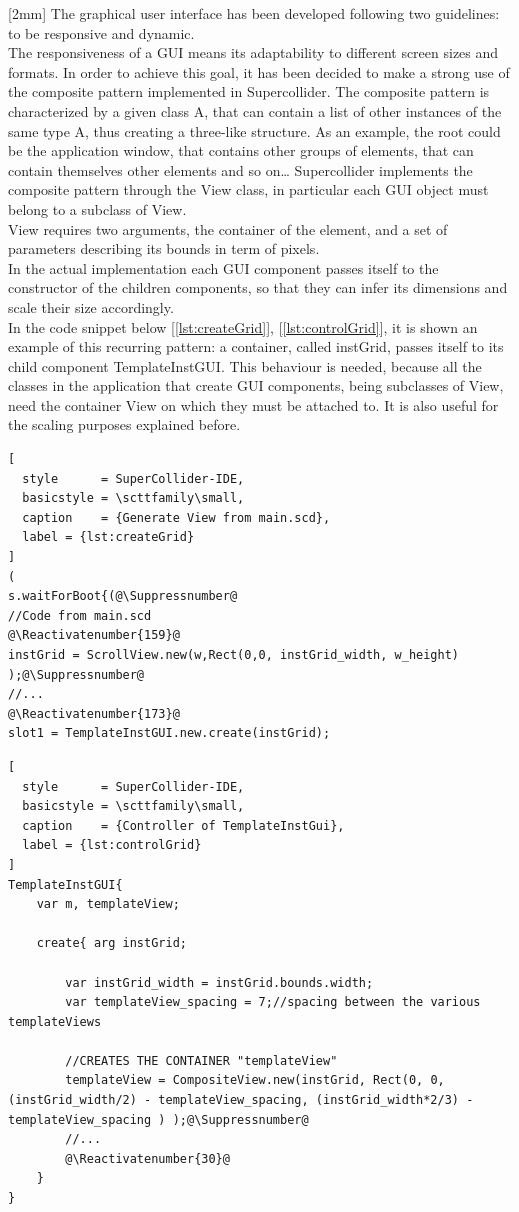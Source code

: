 \documentclass[main.tex]{subfiles}
\begin{document}
[2mm]
The graphical user interface has been developed following two guidelines: to be responsive and dynamic.\\
[2mm]
The responsiveness of a GUI means its adaptability to different screen sizes and formats. In order to achieve this goal, it has been decided to make a strong use of the composite pattern implemented in Supercollider.
The composite pattern is characterized by a given class A, that can contain a list of other instances of the same type A, thus creating a three-like structure. As an example, the root could be the application window, that contains other groups of elements, that can contain themselves other elements and so on…
Supercollider implements the composite pattern through the View class, in particular each GUI object must belong to a subclass of View.\\
[2mm]
View requires two arguments, the container of the element, and a set of parameters describing its bounds in term of pixels.\\
In the actual implementation each GUI component passes itself to the constructor of the children components, so that they can infer its dimensions and scale their size accordingly.\\
In the code snippet below [\autoref{lst:createGrid}], [\autoref{lst:controlGrid}], it is shown an example of this recurring pattern: a container, called instGrid, passes itself to its child component TemplateInstGUI. This behaviour is needed, because all the classes in the application that create GUI components, being subclasses of View, need the container View on which they must be attached to. It is also useful for the scaling purposes explained before.\\
[2mm]
\begin{lstlisting}[
  style      = SuperCollider-IDE,
  basicstyle = \scttfamily\small,
  caption    = {Generate View from main.scd},
  label = {lst:createGrid}
]
(
s.waitForBoot{(@\Suppressnumber@
//Code from main.scd
@\Reactivatenumber{159}@
instGrid = ScrollView.new(w,Rect(0,0, instGrid_width, w_height) );@\Suppressnumber@
//...
@\Reactivatenumber{173}@
slot1 = TemplateInstGUI.new.create(instGrid);
\end{lstlisting}

\begin{lstlisting}[
  style      = SuperCollider-IDE,
  basicstyle = \scttfamily\small,
  caption    = {Controller of TemplateInstGui},
  label = {lst:controlGrid}
]
TemplateInstGUI{
	var m, templateView;
	
	create{ arg instGrid;
		
		var instGrid_width = instGrid.bounds.width;
		var templateView_spacing = 7;//spacing between the various templateViews
		
		//CREATES THE CONTAINER "templateView"
		templateView = CompositeView.new(instGrid, Rect(0, 0, (instGrid_width/2) - templateView_spacing, (instGrid_width*2/3) - templateView_spacing ) );@\Suppressnumber@
		//...
		@\Reactivatenumber{30}@
	}
}
\end{lstlisting}
\end{document}
